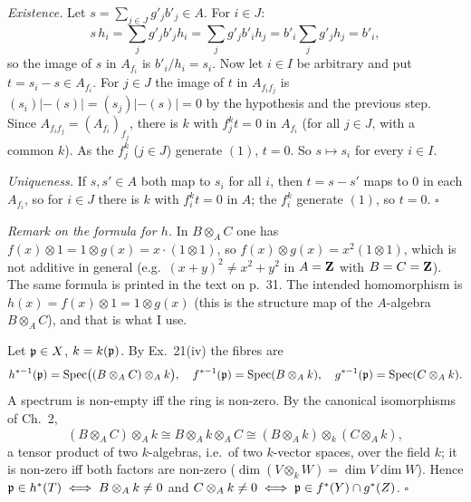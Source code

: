 \documentclass[11pt]{article}
\begin{document}
\emph{Existence.} Let $s=\sum_{j\in J}g'_jb'_j\in A$. For $i\in J$:
\[
s\,h_i=\sum_jg'_jb'_jh_i=\sum_jg'_jb'_ih_j=b'_i\sum_jg'_jh_j=b'_i,
\]
so the image of $s$ in $A_{f_i}$ is $b'_i/h_i=s_i$. Now let $i\in I$ be arbitrary and put $t=s_i-s\in A_{f_i}$. For $j\in J$ the image of $t$ in $A_{f_if_j}$ is $(s_i)|-(s)|=(s_j)|-(s)|=0$ by the hypothesis and the previous step. Since $A_{f_if_j}=(A_{f_i})_{f_j}$, there is $k$ with $f_j^kt=0$ in $A_{f_i}$ (for all $j\in J$, with a common $k$). As the $f_j^k$ ($j\in J$) generate $(1)$, $t=0$. So $s\mapsto s_i$ for every $i\in I$.

\emph{Uniqueness.} If $s,s'\in A$ both map to $s_i$ for all $i$, then $t=s-s'$ maps to $0$ in each $A_{f_i}$, so for $i\in J$ there is $k$ with $f_i^kt=0$ in $A$; the $f_i^k$ generate $(1)$, so $t=0$. \hfill$\square$

\pf
\emph{Remark on the formula for $h$.} In $B\otimes_AC$ one has $f(x)\otimes1=1\otimes g(x)=x\cdot(1\otimes1)$, so $f(x)\otimes g(x)=x^2(1\otimes1)$, which is not additive in general (e.g.\ $(x+y)^2\ne x^2+y^2$ in $A=\mathbf Z$ with $B=C=\mathbf Z$). The same formula is printed in the text on p.~31. The intended homomorphism is $h(x)=f(x)\otimes1=1\otimes g(x)$ (this is the structure map of the $A$-algebra $B\otimes_AC$), and that is what I use.

Let $\mathfrak p\in X$, $k=k(\mathfrak p)$. By Ex.~21(iv) the fibres are
\[
h^{*-1}(\mathfrak p)=\operatorname{Spec}\bigl((B\otimes_AC)\otimes_Ak\bigr),\quad f^{*-1}(\mathfrak p)=\operatorname{Spec}(B\otimes_Ak),\quad g^{*-1}(\mathfrak p)=\operatorname{Spec}(C\otimes_Ak).
\]
A spectrum is non-empty iff the ring is non-zero. By the canonical isomorphisms of Ch.~2,
\[
(B\otimes_AC)\otimes_Ak\cong B\otimes_Ak\otimes_AC\cong(B\otimes_Ak)\otimes_k(C\otimes_Ak),
\]
a tensor product of two $k$-algebras, i.e.\ of two $k$-vector spaces, over the field $k$; it is non-zero iff both factors are non-zero ($\dim(V\otimes_kW)=\dim V\dim W$). Hence
$\mathfrak p\in h^*(T)\iff B\otimes_Ak\ne0$ and $C\otimes_Ak\ne0\iff\mathfrak p\in f^*(Y)\cap g^*(Z)$. \hfill$\square$
\end{document}
